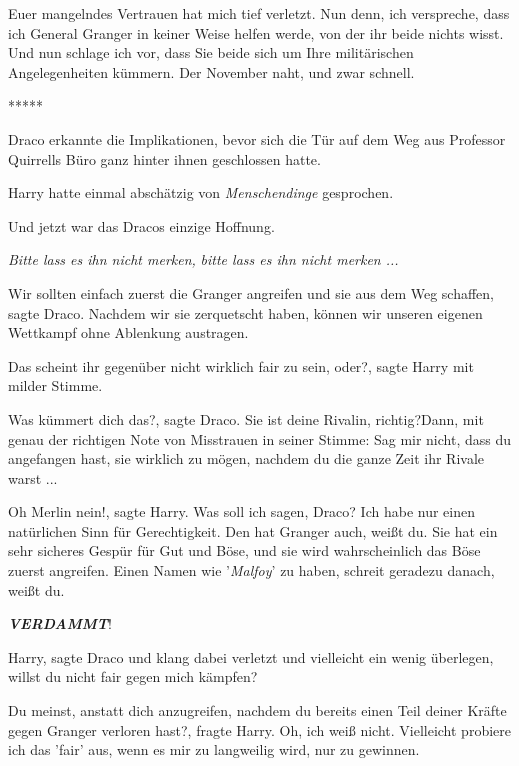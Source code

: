 \glqq{}Euer mangelndes Vertrauen hat mich tief verletzt. Nun denn, ich
verspreche, dass ich General Granger in keiner Weise helfen werde, von der ihr
beide nichts wisst. Und nun schlage ich vor, dass Sie beide sich um Ihre
militärischen Angelegenheiten kümmern. Der November naht, und zwar
schnell.\grqq{}

\begin{center}*****\end{center}

Draco erkannte die Implikationen, bevor sich die Tür auf dem Weg aus Professor
Quirrells Büro ganz hinter ihnen geschlossen hatte.

Harry hatte einmal abschätzig von \glqq{}\emph{Menschendinge}\grqq{} gesprochen.

Und jetzt war das Dracos einzige Hoffnung.

\emph{Bitte lass es ihn nicht merken,} \emph{bitte lass es ihn nicht merken ...}

\glqq{}Wir sollten einfach zuerst die Granger angreifen und sie aus dem Weg
schaffen\grqq{}, sagte Draco. \glqq{}Nachdem wir sie zerquetscht haben, können
wir unseren eigenen Wettkampf ohne Ablenkung austragen.\grqq{}

\glqq{}Das scheint ihr gegenüber nicht wirklich fair zu sein, oder?\grqq{},
sagte Harry mit milder Stimme.

\glqq{}Was kümmert dich das?\grqq{}, sagte Draco. \glqq{}Sie ist deine Rivalin,
richtig?\grqq{}Dann, mit genau der richtigen Note von Misstrauen in seiner
Stimme: \glqq{}Sag mir nicht, dass du angefangen hast, sie wirklich zu mögen,
nachdem du die ganze Zeit ihr Rivale warst ...\grqq{}

\glqq{}Oh Merlin nein!\grqq{}, sagte Harry. \glqq{}Was soll ich sagen, Draco?
Ich habe nur einen natürlichen Sinn für Gerechtigkeit. Den hat Granger auch,
weißt du. Sie hat ein sehr sicheres Gespür für Gut und Böse, und sie wird
wahrscheinlich das Böse zuerst angreifen. Einen Namen wie '\emph{Malfoy}' zu
haben, schreit geradezu danach, weißt du.\grqq{}

\textbf{\emph{VERDAMMT}}!

\glqq{}Harry\grqq{}, sagte Draco und klang dabei verletzt und vielleicht ein
wenig überlegen, \glqq{}willst du nicht fair gegen mich kämpfen?\grqq{}

\glqq{}Du meinst, anstatt dich anzugreifen, nachdem du bereits einen Teil deiner
Kräfte gegen Granger verloren hast?\grqq{}, fragte Harry. \glqq{}Oh, ich weiß
nicht. Vielleicht probiere ich das 'fair' aus, wenn es mir zu langweilig wird,
nur zu gewinnen.\grqq{}

